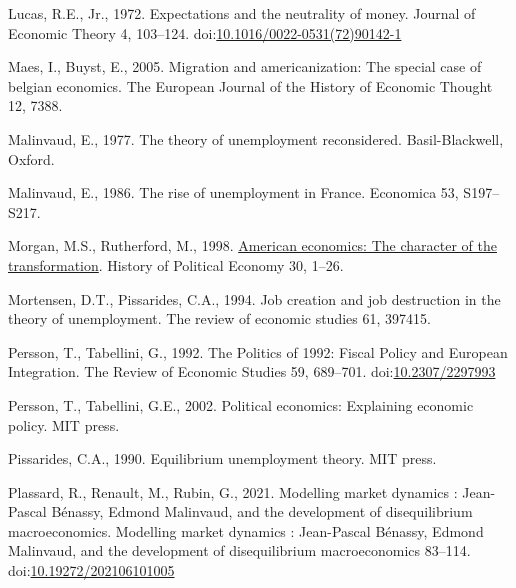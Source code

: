 \documentclass[
  12pt,
  onecolumn]{article}
\newlength{\cslhangindent}
\newlength{\cslentryspacingunit} %
\newenvironment{CSLReferences}[2] %
 {%
  \setlength{\parindent}{0pt}
  \ifodd #1
  \let\oldpar\par
  \def\par{\hangindent=\cslhangindent\oldpar}
  \fi
  \setlength{\parskip}{#2\cslentryspacingunit}
 }%
 {}
\begin{document}
\begin{CSLReferences}{1}{0}
\leavevmode{}%
Lucas, R.E., Jr., 1972. Expectations and the neutrality of money.
Journal of Economic Theory 4, 103--124.
doi:\href{https://doi.org/10.1016/0022-0531(72)90142-1}{10.1016/0022-0531(72)90142-1}

\leavevmode{}%
Maes, I., Buyst, E., 2005. Migration and americanization: The special
case of belgian economics. The European Journal of the History of
Economic Thought 12, 7388.

\leavevmode{}%
Malinvaud, E., 1977. The theory of unemployment reconsidered.
{Basil-Blackwell}, {Oxford}.

\leavevmode{}%
Malinvaud, E., 1986. The rise of unemployment in {France}. Economica 53,
S197--S217.

\leavevmode{}%
Morgan, M.S., Rutherford, M., 1998.
\href{http://search.ebscohost.com/login.aspx?direct=true\&db=bth\&AN=7752144\&lang=fr\&site=ehost-live}{American
economics: The character of the transformation}. History of Political
Economy 30, 1--26.

\leavevmode{}%
Mortensen, D.T., Pissarides, C.A., 1994. Job creation and job
destruction in the theory of unemployment. The review of economic
studies 61, 397415.

\leavevmode{}%
Persson, T., Tabellini, G., 1992. The {Politics} of 1992: {Fiscal
Policy} and {European Integration}. The Review of Economic Studies 59,
689--701. doi:\href{https://doi.org/10.2307/2297993}{10.2307/2297993}

\leavevmode{}%
Persson, T., Tabellini, G.E., 2002. Political economics: Explaining
economic policy. {MIT press}.

\leavevmode{}%
Pissarides, C.A., 1990. Equilibrium unemployment theory. MIT press.

\leavevmode{}%
Plassard, R., Renault, M., Rubin, G., 2021. Modelling market dynamics :
{Jean-Pascal Bénassy}, {Edmond Malinvaud}, and the development of
disequilibrium macroeconomics. Modelling market dynamics : Jean-Pascal
Bénassy, Edmond Malinvaud, and the development of disequilibrium
macroeconomics 83--114.
doi:\href{https://doi.org/10.19272/202106101005}{10.19272/202106101005}


\end{CSLReferences}
\end{document}
